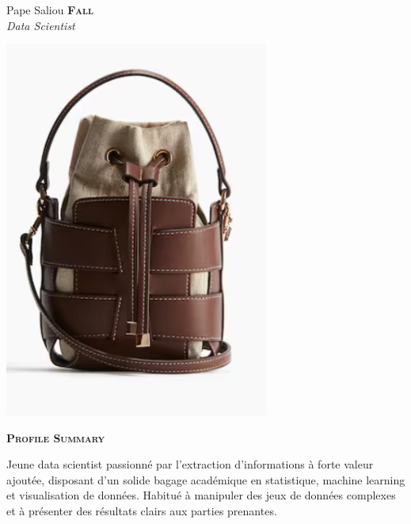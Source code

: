 \documentclass[11pt,a4paper]{article}
\newcommand{\headleft}[1]{\vspace*{3ex}\textsc{\textbf{#1}}\par%
    \vspace*{-1.5ex}\hrulefill\par\vspace*{0.7ex}}
\begin{document}
\setlength{\topskip}{0pt}\setlength{\parindent}{0pt}\setlength{\parskip}{0pt}
\setlength{\fboxsep}{0pt}\pagestyle{empty}\raggedbottom

\begin{minipage}[t]{0.33\textwidth}
\colorbox{cvblue}{\begin{minipage}[t][5mm][t]{\textwidth}\null\hfill\null\end{minipage}}
\vspace{-.2ex}
\colorbox{cvblue!90}{\color{white}
\textwidth
\begin{minipage}[t][293mm][t]{0.82\textwidth}\raggedright
\vspace*{2.5ex}

\Large Pape Saliou \textbf{\textsc{Fall}} \normalsize\\
\textit{Data Scientist}

\null\hfill\includegraphics[width=0.65\textwidth]{38e0137e987843fea393ad1a95590721.png}\hfill\null

\vspace*{0.5ex}

\headleft{Profile Summary}
Jeune data scientist passionné par l’extraction d’informations à forte valeur ajoutée, disposant d’un solide bagage académique en statistique, machine learning et visualisation de données. Habitué à manipuler des jeux de données complexes et à présenter des résultats clairs aux parties prenantes.


\end{minipage}}
\end{minipage}
\end{document}
